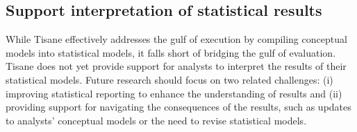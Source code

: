 \subsection{Support interpretation of statistical results}

While Tisane effectively addresses the gulf of execution by compiling conceptual
models into statistical models, it falls short of bridging the gulf of
evaluation. Tisane does not yet provide support for analysts to interpret the
results of their statistical models. Future research should focus on two related
challenges: (i) improving statistical reporting to enhance the understanding of
results and (ii) providing support for navigating the consequences of the
results, such as updates to analysts' conceptual models or the need to revise
statistical models.

